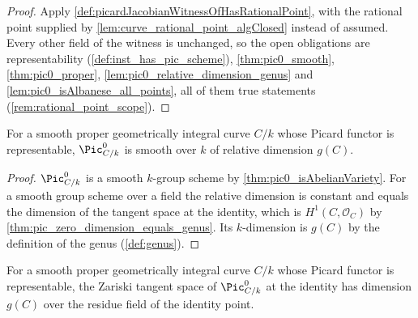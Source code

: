 \begin{proof}
  Apply \cref{def:picardJacobianWitnessOfHasRationalPoint}, with the rational point
  supplied by \cref{lem:curve_rational_point_algClosed} instead of assumed. Every
  other field of the witness is unchanged, so the open obligations are
  representability (\cref{def:inst_has_pic_scheme}), \cref{thm:pic0_smooth},
  \cref{thm:pic0_proper}, \cref{lem:pic0_relative_dimension_genus} and
  \cref{lem:pic0_isAlbanese_all_points}, all of them true statements
  (\cref{rem:rational_point_scope}).
\end{proof}

\begin{lemma}
  \label{lem:pic0_relative_dimension_genus}
  For a smooth proper geometrically integral curve \(C/k\) whose Picard functor is
  representable, \(\Pic^0_{C/k}\) is smooth over \(k\) of relative dimension
  \(g(C)\).
\end{lemma}

\begin{proof}
  \(\Pic^0_{C/k}\) is a smooth \(k\)-group scheme by
  \cref{thm:pic0_isAbelianVariety}. For a smooth group scheme over a field the
  relative dimension is constant and equals the dimension of the tangent space at
  the identity, which is \(H^1(C,\mathcal O_C)\) by
  \cref{thm:pic_zero_dimension_equals_genus}. Its \(k\)-dimension is \(g(C)\) by
  the definition of the genus (\cref{def:genus}).
\end{proof}

\begin{lemma}
  \label{lem:pic0_tangent_dimension_genus}
  \leanok
  For a smooth proper geometrically integral curve \(C/k\) whose Picard functor is
  representable, the Zariski tangent space of \(\Pic^0_{C/k}\) at the identity has
  dimension \(g(C)\) over the residue field of the identity point.
\end{lemma}

